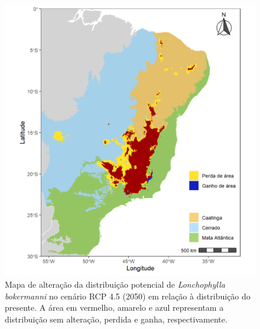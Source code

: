 \documentclass[
  11pt,
]{article}
\begin{document}
\begin{figure}
\centering
\includegraphics[width=1\textwidth,height=\textheight]{../Graficos/L_bokermanni_mapas_feitos/alteracao_RCP45.jpeg}
\caption{Mapa de alteração da distribuição potencial de
\emph{Lonchophylla bokermanni} no cenário RCP 4.5 (2050) em relação à
distribuição do presente. A área em vermelho, amarelo e azul representam
a distribuição sem alteração, perdida e ganha, respectivamente.}
\end{figure}
\end{document}

